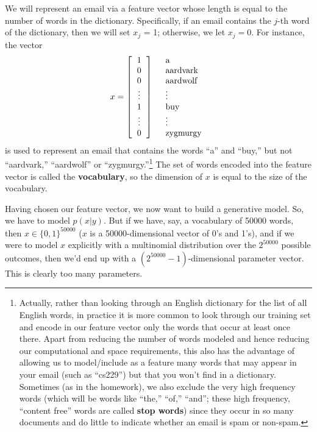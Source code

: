 \documentclass{article}
\begin{document}
We will represent an email via a feature vector whose length is equal to the number
of words in the dictionary.  Specifically, if an email contains the $j$-th word of the
dictionary, then we will set $x_j$ = 1; otherwise, we let $x_j=0$.  For instance,
the vector
\[
x = \left[\begin{tabular}{c} 1 \\ 0 \\ 0 \\ \vdots \\ 1 \\ \vdots \\ 0 \end{tabular} \right]
\;\;\;\begin{tabular}{l} a \\ aardvark \\ aardwolf \\ \vdots \\ buy \\ \vdots \\ zygmurgy \end{tabular}
\]
is used to represent an email that contains the words ``a'' and ``buy,'' but
not ``aardvark,'' ``aardwolf'' or ``zygmurgy.''\footnote{Actually,
rather than looking through an English dictionary for the list of all English words,
in practice
it is more common to look through our training set and encode in our feature vector
only the words that occur at least once there.  Apart from reducing the number of
words modeled and hence reducing our computational and space requirements, this also
has the advantage of allowing us to model/include as a feature many words that may appear in your
email (such as ``cs229'') but that you won't find in a dictionary.
Sometimes (as in the homework),
we also exclude the very high frequency words (which will be words like ``the,'' ``of,'' ``and'';
these high frequency, ``content free'' words are called {\bf stop words}) since they occur in so
many documents and do little to indicate whether an email is spam or non-spam.}
The set of words encoded into the feature vector is called the {\bf vocabulary}, so
the dimension of $x$ is equal to the size of the vocabulary.


Having chosen our feature vector, we now want to build a generative model.
So, we have to model  $p(x|y)$.  But if we have, say, a vocabulary of 50000 words,
then $x \in \{0,1\}^{50000}$ ($x$ is a 50000-dimensional vector of 0's and 1's),
and if we were to model $x$ explicitly with a multinomial
distribution over the $2^{50000}$ possible outcomes, then we'd end up with a
$(2^{50000}-1)$-dimensional parameter vector.  This is clearly too many parameters.
\end{document}
